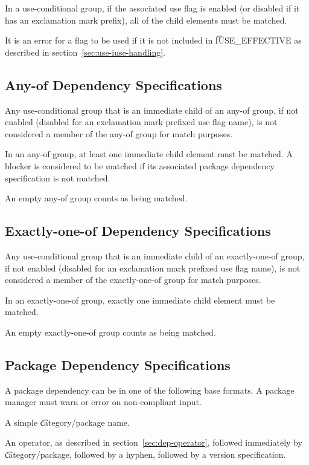 In a use-conditional group, if the associated use flag is enabled (or disabled if it has an
exclamation mark prefix), all of the child elements must be matched.

It is an error for a flag to be used if it is not included in \t{IUSE\_EFFECTIVE} as described in
section~\ref{sec:use-iuse-handling}.

\subsection{Any-of Dependency Specifications}

Any use-conditional group that is an immediate child of an any-of group, if not enabled (disabled
for an exclamation mark prefixed use flag name), is not considered a member of the any-of group
for match purposes.

In an any-of group, at least one immediate child element must be matched. A blocker is
considered to be matched if its associated package dependency specification is not matched.

An empty any-of group counts as being matched.

\subsection{Exactly-one-of Dependency Specifications}

Any use-conditional group that is an immediate child of an exactly-one-of group, if not enabled
(disabled for an exclamation mark prefixed use flag name), is not considered a member of the
exactly-one-of group for match purposes.

In an exactly-one-of group, exactly one immediate child element must be matched.

An empty exactly-one-of group counts as being matched.

\subsection{Package Dependency Specifications}

A package dependency can be in one of the following base formats. A package manager must warn or
error on non-compliant input.

\begin{compactitem}
\item A simple \t{category/package} name.
\item An operator, as described in section~\ref{sec:dep-operator}, followed immediately by
    \t{category/package}, followed by a hyphen, followed by a version specification.
\end{compactitem}

